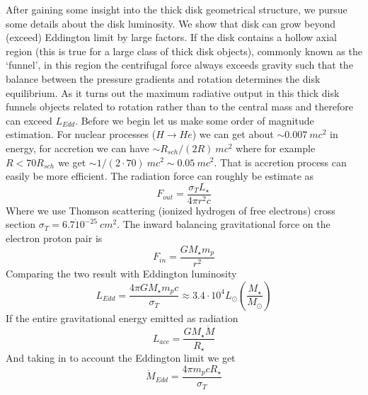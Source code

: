 \documentclass[a4paper,12pt,modern]{aastex62}
\begin{document}
After gaining some insight into the thick disk geometrical structure, we pursue some details about the disk luminosity. We show that disk can grow beyond (exceed) Eddington limit by large factors. If the disk contains a hollow axial region (this is true for a large class of thick disk objects), commonly known as the `funnel’, in this region the centrifugal force always exceeds gravity such that the balance between the pressure gradients and rotation determines the disk equilibrium.
As it turns out the maximum radiative output in this thick disk funnels objects related to rotation rather than to the central mass and therefore can exceed $L_{Edd}$.
Before we begin let us make some order of magnitude estimation. 
For nuclear processes ($H\rightarrow He$) we can get about $\sim 0.007~mc^2$ in energy, for accretion we can have $\sim R_{sch}/(2R) ~mc^2$ where for example $R<70R_{sch}$ we get $\sim 1/(2\cdot 70) ~mc^2 \sim 0.05~mc^2$. That is accretion process can easily be more efficient. 
The radiation force can roughly be estimate as 
\begin{equation}
F_{out}=\frac{\sigma_T L_\star}{4\pi r^2 c}
\end{equation}
Where we use Thomson scattering (ionized hydrogen of free electrons) cross section $\sigma_T=6.7\dot10^{-25} ~cm^2$.
The inward balancing gravitational force on the electron proton pair is 
\begin{equation}
F_{in}=\frac{GM_\star m_p}{r^2}
\end{equation}
Comparing the two result with Eddington luminosity 
\begin{equation}
L_{Edd} = \frac{4\pi G M_\star m_p c}{\sigma_T}\approx 3.4\cdot 10^4 L_\odot \left( \frac{M_\star}{M_\odot} \right)
\end{equation}
If the entire gravitational energy emitted as radiation 
\begin{equation}
L_{acc} = \frac{G M_\star \dot M}{R_\star}
\end{equation}
And taking in to account the Eddington limit we get
\begin{equation}
\dot M_{Edd} = \frac{4\pi m_p c R_\star}{\sigma_T}
\end{equation}
\end{document}
